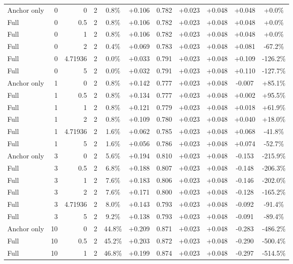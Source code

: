 \begin{table}[htbp]
\begin{tabular}{lrrrccccccc}
Anchor only & 0 & 0 & 2 & 0.8\% & +0.106 & 0.782 & +0.023 & +0.048 & +0.048 & +0.0\% \\
Full & 0 & 0.5 & 2 & 0.8\% & +0.106 & 0.782 & +0.023 & +0.048 & +0.048 & +0.0\% \\
Full & 0 & 1 & 2 & 0.8\% & +0.106 & 0.782 & +0.023 & +0.048 & +0.048 & +0.0\% \\
Full & 0 & 2 & 2 & 0.4\% & +0.069 & 0.783 & +0.023 & +0.048 & +0.081 & -67.2\% \\
Full & 0 & 4.71936 & 2 & 0.0\% & +0.033 & 0.791 & +0.023 & +0.048 & +0.109 & -126.2\% \\
Full & 0 & 5 & 2 & 0.0\% & +0.032 & 0.791 & +0.023 & +0.048 & +0.110 & -127.7\% \\
Anchor only & 1 & 0 & 2 & 0.8\% & +0.142 & 0.777 & +0.023 & +0.048 & -0.007 & +85.1\% \\
Full & 1 & 0.5 & 2 & 0.8\% & +0.134 & 0.777 & +0.023 & +0.048 & +0.002 & +95.5\% \\
Full & 1 & 1 & 2 & 0.8\% & +0.121 & 0.779 & +0.023 & +0.048 & +0.018 & +61.9\% \\
Full & 1 & 2 & 2 & 0.8\% & +0.109 & 0.780 & +0.023 & +0.048 & +0.040 & +18.0\% \\
Full & 1 & 4.71936 & 2 & 1.6\% & +0.062 & 0.785 & +0.023 & +0.048 & +0.068 & -41.8\% \\
Full & 1 & 5 & 2 & 1.6\% & +0.056 & 0.786 & +0.023 & +0.048 & +0.074 & -52.7\% \\
Anchor only & 3 & 0 & 2 & 5.6\% & +0.194 & 0.810 & +0.023 & +0.048 & -0.153 & -215.9\% \\
Full & 3 & 0.5 & 2 & 6.8\% & +0.188 & 0.807 & +0.023 & +0.048 & -0.148 & -206.3\% \\
Full & 3 & 1 & 2 & 7.6\% & +0.183 & 0.806 & +0.023 & +0.048 & -0.146 & -202.0\% \\
Full & 3 & 2 & 2 & 7.6\% & +0.171 & 0.800 & +0.023 & +0.048 & -0.128 & -165.2\% \\
Full & 3 & 4.71936 & 2 & 8.0\% & +0.143 & 0.793 & +0.023 & +0.048 & -0.092 & -91.4\% \\
Full & 3 & 5 & 2 & 9.2\% & +0.138 & 0.793 & +0.023 & +0.048 & -0.091 & -89.4\% \\
Anchor only & 10 & 0 & 2 & 44.8\% & +0.209 & 0.871 & +0.023 & +0.048 & -0.283 & -486.2\% \\
Full & 10 & 0.5 & 2 & 45.2\% & +0.203 & 0.872 & +0.023 & +0.048 & -0.290 & -500.4\% \\
Full & 10 & 1 & 2 & 46.8\% & +0.199 & 0.874 & +0.023 & +0.048 & -0.297 & -514.5\% \\

\end{tabular}
\end{table}
